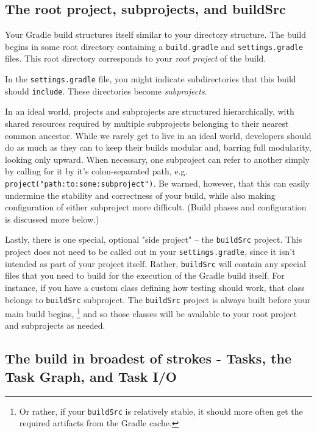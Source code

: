 \documentclass[]{article}
\theoremstyle{definition}
\begin{document}
\subsection{The root project, subprojects, and buildSrc}

Your Gradle build structures itself similar to your directory structure.
The build begins in some root directory containing a \texttt{build.gradle} and \texttt{settings.gradle} files.
This root directory corresponds to your \emph{root project} of the build.

In the \texttt{settings.gradle} file, you might indicate subdirectories that this build should \texttt{include}.
These directories become \emph{subprojects}.

In an ideal world, projects and subprojects are structured hierarchically,
 with shared resources required by multiple subprojects belonging to their nearest common ancestor.
While we rarely get to live in an ideal world, developers should do as much as they can to keep their builds modular and,
  barring full modularity, looking only upward.
When necessary, one subproject can refer to another simply by calling for it by it's colon-separated path, e.g. \texttt{project("path:to:some:subproject")}.
Be warned, however, that this can easily undermine the stability and correctness of your build, while also making configuration of either subproject more difficult.
(Build phases and configuration is discussed more below.)

Lastly, there is one special, optional "side project" -- the \texttt{buildSrc} project.
This project does not need to be called out in your \texttt{settings.gradle}, since it isn't intended as part of your project itself.
Rather, \texttt{buildSrc} will contain any special files that you need to build for the execution of the Gradle build itself.
For instance, if you have a custom class defining how testing should work, that class belongs to \texttt{buildSrc} subproject.
The \texttt{buildSrc} project is always built before your main build begins,%
\footnote{
  Or rather, if your \texttt{buildSrc} is relatively stable, it should more often get the required artifacts from the Gradle cache.
}
and so those classes will be available to your root project and subprojects as needed.


\subsection{The build in broadest of strokes - Tasks, the Task Graph, and Task I/O}
\end{document}

